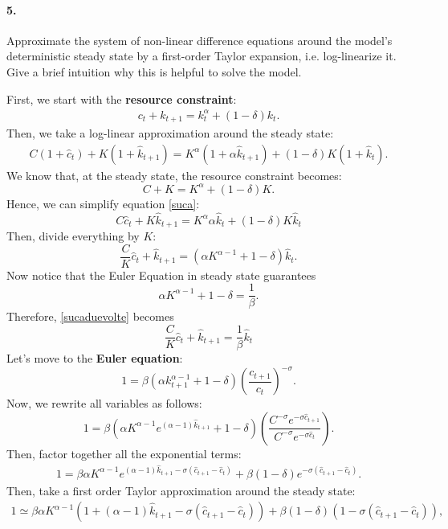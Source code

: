 \documentclass[dvipsnames,11pt]{article}
\begin{document}
\paragraph{5. }Approximate the system of non-linear difference equations around the model's deterministic steady state by a first-order Taylor expansion, i.e. log-linearize it. Give a brief intuition why this is helpful to solve the model.

                \begin{solution}
First, we start with the \textbf{resource constraint}:
\begin{align*}
    c_t+k_{t+1}=k_t^\alpha+(1-\delta)k_t.
\end{align*}
Then, we take a log-linear approximation around the steady state:
\begin{align}
    C(1+\hat c_t)+K(1+\hat k_{t+1})=K^\alpha(1+\alpha\hat k_{t+1})+(1-\delta)K(1+\hat k_t). \label{suca}
\end{align}
We know that, at the steady state, the resource constraint becomes:
\[
C+K=K^\alpha+(1-\delta)K.
\]
Hence, we can simplify equation \eqref{suca}:
\[
C\hat c_t+K\hat k_{t+1}=K^\alpha \alpha \hat k_t+(1-\delta)K\hat k_t
\]
Then, divide everything by $K$:
\begin{equation}
    \frac{C}{K}\hat c_t+\hat k_{t+1}=(\alpha K^{\alpha-1}+1-\delta)\hat k_t. \label{sucaduevolte}
\end{equation}
Now notice that the Euler Equation in steady state guarantees
\[
\alpha K^{\alpha-1}+1-\delta =\frac{1}{\beta}.
\]
Therefore, \eqref{sucaduevolte} becomes
\[
\frac{C}{K}\hat c_t+\hat k_{t+1}=\frac{1}{\beta}\hat k_t
\]
Let's move to the \textbf{Euler equation}:
\[
1=\beta(\alpha k_{t+1}^{\alpha-1}+1-\delta)\left( \frac{c_{t+1}}{c_t}\right)^{-\sigma}.
\]
Now, we rewrite all variables as follows:
\[
1=\beta(\alpha K^{\alpha-1}e^{(\alpha-1)\hat k_{t+1}}+1-\delta)\left( \frac{C^{-\sigma}e^{-\sigma \hat c_{t+1}}}{C^{-\sigma}e^{-\sigma \hat c_{t}}}\right).
\]
Then, factor together all the exponential terms:
\begin{align*}
    1= \beta \alpha K^{\alpha-1}e^{(\alpha-1)\hat k_{t+1}-\sigma(\hat c_{t+1}-\hat c_t)}+\beta(1-\delta)e^{-\sigma(\hat c_{t+1}-\hat c_t)}.
\end{align*}
Then, take a first order Taylor approximation around the steady state:
\begin{align*}
    1 \simeq \beta \alpha K^{\alpha-1}(1+(\alpha-1)\hat k_{t+1}-\sigma(\hat c_{t+1}-\hat c_t))+\beta (1-\delta)(1-\sigma(\hat c_{t+1}-\hat c_t)),
\end{align*}

\end{solution}
\end{document}
